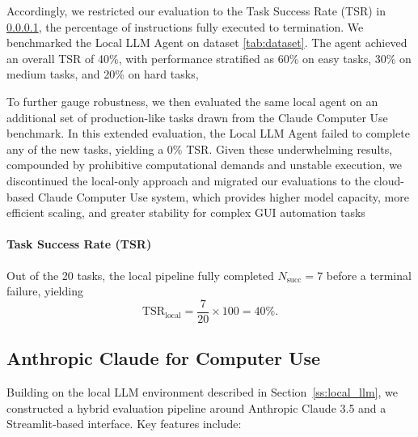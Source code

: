 \documentclass[runningheads]{llncs}
\begin{document}
Accordingly, we restricted our evaluation to the Task Success Rate (TSR) in \ref{p_tsr}, the percentage of instructions fully executed to termination. We benchmarked the Local LLM Agent on dataset \ref{tab:dataset}. The agent achieved an overall TSR of 40\%, with performance stratified as 60\% on easy tasks, 30\% on medium tasks, and 20\% on hard tasks, 

To further gauge robustness, we then evaluated the same local agent on an additional set of production-like tasks drawn from the Claude Computer Use benchmark. In this extended evaluation, the Local LLM Agent failed to complete any of the new tasks, yielding a 0\% TSR. Given these underwhelming results, compounded by prohibitive computational demands and unstable execution, we discontinued the local-only approach and migrated our evaluations to the cloud-based Claude Computer Use system, which provides higher model capacity, more efficient scaling, and greater stability for complex GUI automation tasks

\paragraph{Task Success Rate (TSR)} \label{p_tsr}
Out of the 20 tasks, the local pipeline fully completed $N_{\mathrm{succ}} = 7$ before a terminal failure, yielding
\[
  \mathrm{TSR}_{\mathrm{local}}
  = \frac{7}{20}\times100 = 40\%.
\]
\subsection{Anthropic Claude for Computer Use}

Building on the local LLM environment described in Section~\ref{ss:local_llm}, we constructed a hybrid evaluation pipeline around Anthropic Claude 3.5 and a Streamlit‐based interface. Key features include:
\end{document}
